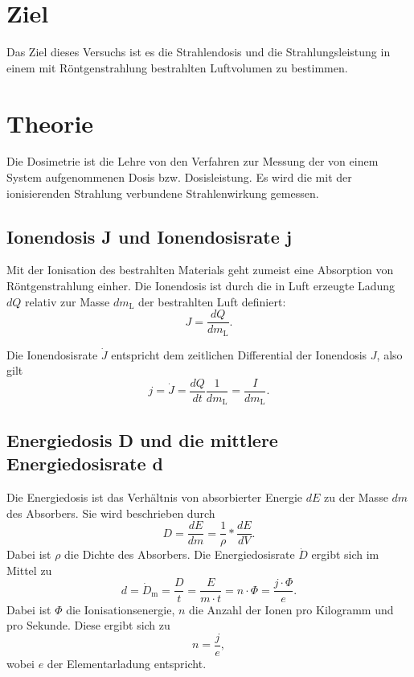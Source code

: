 \section{Ziel}
Das Ziel dieses Versuchs ist es die Strahlendosis und die
Strahlungsleistung in einem mit Röntgenstrahlung bestrahlten
Luftvolumen zu bestimmen.

\section{Theorie}
\label{sec:Theorie}

Die Dosimetrie ist die Lehre von den Verfahren zur Messung 
der von einem System aufgenommenen Dosis bzw. Dosisleistung.
Es wird die mit der ionisierenden Strahlung
verbundene Strahlenwirkung gemessen.


\subsection{Ionendosis J und Ionendosisrate j}
Mit der Ionisation des bestrahlten Materials geht zumeist
eine Absorption von Röntgenstrahlung einher. %
Die Ionendosis ist durch die in Luft erzeugte Ladung $dQ$
relativ zur Masse $dm_\text{L}$ der bestrahlten Luft definiert:
\begin{equation*}
    J = \frac{dQ}{dm_\text{L}}.
    \label{eqn:Ionendosis}
\end{equation*}

Die Ionendosisrate $\dot{J}$ entspricht dem zeitlichen Differential der Ionendosis $J$, also gilt 
\begin{equation}
    j = \dot{J} =\frac{dQ}{dt} \frac{1}{dm_\text{L}} =\frac{I}{dm_\text{L}} .
    \label{eqn:Ionendosis}
\end{equation}

\subsection{Energiedosis D und die mittlere Energiedosisrate d}
Die Energiedosis ist das Verhältnis von absorbierter
Energie $dE$ zu der Masse $dm$ des Absorbers.
Sie wird beschrieben durch
\begin{equation*}
    D = \frac{dE}{dm} = \frac{1}{\rho} * \frac{dE}{dV}.
    \label{eqn:Energiedosis}
\end{equation*}
Dabei ist $\rho$ die Dichte des Absorbers.
Die Energiedosisrate $\dot{D}$ ergibt sich im Mittel zu 
\begin{equation}
    d = \dot{D}_\text{m} = \frac{D}{t} =\frac{E}{m \cdot t} = n \cdot \Phi = \frac{j \cdot \Phi}{e}.
    \label{eqn:Energiedosisrate}
\end{equation}
Dabei ist $\Phi$ die Ionisationsenergie, $n$ die Anzahl der Ionen pro Kilogramm und pro Sekunde. 
Diese ergibt sich zu
\begin{equation*}
    n = \frac{j}{e},
    \label{eqn:Ionenanzahl}
\end{equation*}
wobei $e$ der Elementarladung entspricht. 

